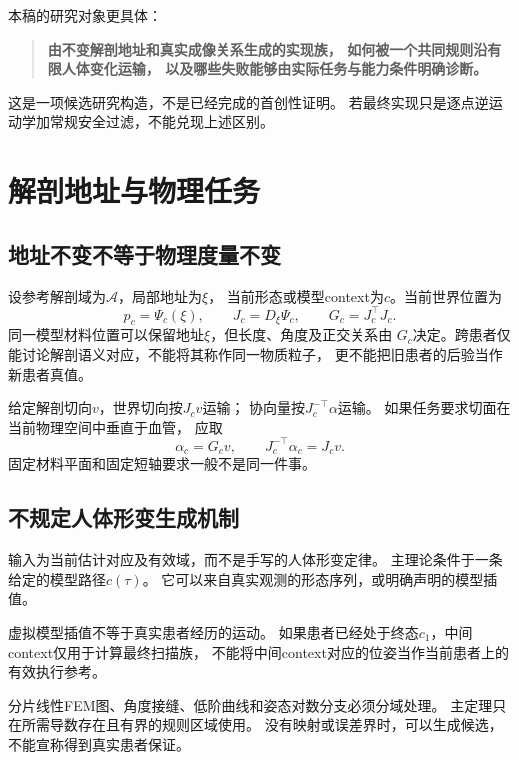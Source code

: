 \documentclass[UTF8,11pt,a4paper,fontset=fandol]{ctexart}
\numberwithin{equation}{section}
\theoremstyle{definition}
\begin{document}
本稿的研究对象更具体：
\begin{quote}
\textbf{由不变解剖地址和真实成像关系生成的实现族，
如何被一个共同规则沿有限人体变化运输，
以及哪些失败能够由实际任务与能力条件明确诊断。}
\end{quote}

这是一项候选研究构造，不是已经完成的首创性证明。
若最终实现只是逐点逆运动学加常规安全过滤，不能兑现上述区别。

\section{解剖地址与物理任务}

\subsection{地址不变不等于物理度量不变}

设参考解剖域为$\mathcal A$，局部地址为$\xi$，
当前形态或模型context为$c$。当前世界位置为
\begin{equation}
 p_c=\Psi_c(\xi),\qquad
 J_c=D_\xi\Psi_c,\qquad
 G_c=J_c^\top J_c.
 \label{eq:anatomy}
\end{equation}
同一模型材料位置可以保留地址$\xi$，但长度、角度及正交关系由
$G_c$决定。跨患者仅能讨论解剖语义对应，不能将其称作同一物质粒子，
更不能把旧患者的后验当作新患者真值。

给定解剖切向$v$，世界切向按$J_cv$运输；
协向量按$J_c^{-\top}\alpha$运输。
如果任务要求切面在当前物理空间中垂直于血管，
应取
\begin{equation}
 \boxed{\alpha_c=G_cv,\qquad
 J_c^{-\top}\alpha_c=J_cv.}
 \label{eq:typed}
\end{equation}
固定材料平面和固定短轴要求一般不是同一件事。

\subsection{不规定人体形变生成机制}

输入为当前估计对应及有效域，而不是手写的人体形变定律。
主理论条件于一条给定的模型路径$c(\tau)$。
它可以来自真实观测的形态序列，或明确声明的模型插值。

虚拟模型插值不等于真实患者经历的运动。
如果患者已经处于终态$c_1$，中间context仅用于计算最终扫描族，
不能将中间context对应的位姿当作当前患者上的有效执行参考。

分片线性FEM图、角度接缝、低阶曲线和姿态对数分支必须分域处理。
主定理只在所需导数存在且有界的规则区域使用。
没有映射或误差界时，可以生成候选，不能宣称得到真实患者保证。
\end{document}

